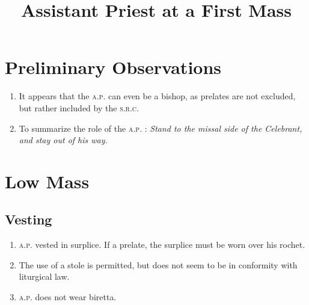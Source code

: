 \documentclass[10pt,twocolumn]{article}
\title{Assistant Priest at a First Mass}
\newcommand{\src}{
    \textsc{s.r.c.}
}
\newcommand{\ap}{
    \textsc{a.p.}
}
\begin{document}
\maketitle

\section*{Preliminary Observations}
\begin{enumerate}
    \item It appears that the \ap can even be a bishop, as prelates are not
        excluded, but rather included by the \src
    \item To summarize the role of the \ap: \textit{Stand to the missal side of
        the Celebrant, and stay out of his way.}
\end{enumerate}

\section*{Low Mass}

\subsection*{Vesting}
\begin{enumerate}
    \item \ap vested in surplice. If a prelate, the surplice must be worn over
        his rochet.
    \item The use of a stole is permitted, but does not seem to be in conformity
        with liturgical law.
    \item \ap does not wear biretta.
\end{enumerate}
\end{document}
